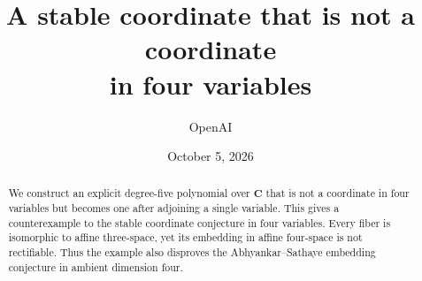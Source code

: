 \documentclass[11pt]{article}
\title{A stable coordinate that is not a coordinate\\in four variables}
\author{OpenAI}
\date{October 5, 2026}
\theoremstyle{definition}
\theoremstyle{remark}
\newcommand{\C}{\mathbf C}
\numberwithin{equation}{section}
\begin{document}
\maketitle
\begin{abstract}
We construct an explicit degree-five polynomial over $\C$ that is not a
coordinate in four variables but becomes one after adjoining a single variable.
This gives a counterexample to the stable coordinate conjecture in four
variables. Every fiber is isomorphic to affine three-space, yet its embedding
in affine four-space is not rectifiable. Thus the example also disproves the
Abhyankar--Sathaye embedding conjecture in ambient dimension four.
\end{abstract}







\end{document}
